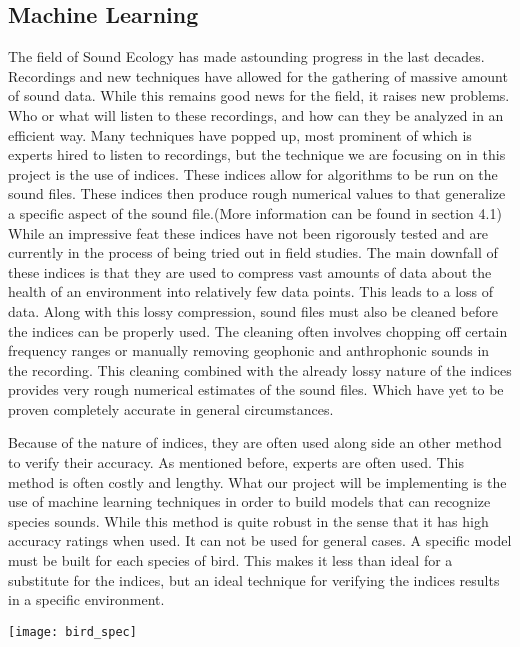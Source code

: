 \subsection{Machine Learning}
\par The field of Sound Ecology has made astounding progress in the last decades. Recordings and new techniques have allowed for the gathering of massive amount of sound data. While this remains good news for the field, it raises new problems. Who or what will listen to these recordings, and how can they be analyzed in an efficient way. Many techniques have popped up, most prominent of which is experts hired to listen to recordings, but the technique we are focusing on in this project is the use of indices. These indices allow for algorithms to be run on the sound files. These indices then produce rough numerical values to that generalize a specific aspect of the sound file.(More information can be found in section 4.1) While an impressive feat these indices have not been rigorously tested and are currently in the process of being tried out in field studies. The main downfall of these indices is that they are used to compress vast amounts of data about the health of an environment into relatively few data points. This leads to a loss of data. Along with this lossy compression, sound files must also be cleaned before the indices can be properly used. The cleaning often involves chopping off certain frequency ranges or manually removing geophonic and anthrophonic sounds in the recording. This cleaning combined with the already lossy nature of the indices provides very rough numerical estimates of the sound files. Which have yet to be proven completely accurate in general circumstances.
\par Because of the nature of indices, they are often used along side an other method to verify their accuracy. As mentioned before, experts are often used. This method is often costly and lengthy. What our project will be implementing is the use of machine learning techniques in order to build models that can recognize species sounds. While this method is quite robust in the sense that it has high accuracy ratings when used. It can not be used for general cases. A specific model must be built for each species of bird. This makes it less than ideal for a substitute for the indices, but an ideal technique for verifying the indices results in a specific environment.
\begin{center}
	\texttt{[image: bird\_spec]}
\end{center}
